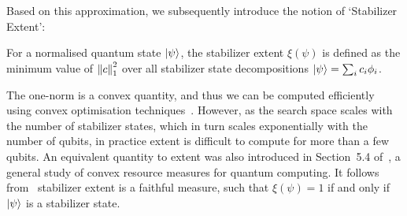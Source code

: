 Based on this approximation, we subsequently introduce the notion of `Stabilizer Extent':
\begin{defn}
For a normalised quantum state $\ket{\psi}$, the stabilizer extent $\xi\left(\psi\right)$ is defined as the minimum value of $\norm{c}^{2}_{1}$ over all stabilizer state decompositions $\ket{\psi}=\sum_{i}c_{i}\phi_{i}$.
\end{defn}
The one-norm is a convex quantity, and thus we can be computed efficiently using convex optimisation techniques~\cite{Boyd2004}. However, as the search space scales with the number of stabilizer states, which in turn scales exponentially with the number of qubits, in practice extent is difficult to compute for more than a few qubits. An equivalent quantity to extent was also introduced in Section~5.4 of~\cite{Regula2018}, a general study of convex resource measures for quantum computing. It follows from~\cite{Regula2018} stabilizer extent is a faithful measure, such that $\xi\left(\psi\right)=1$ if and only if $\ket{\psi}$ is a stabilizer state.
